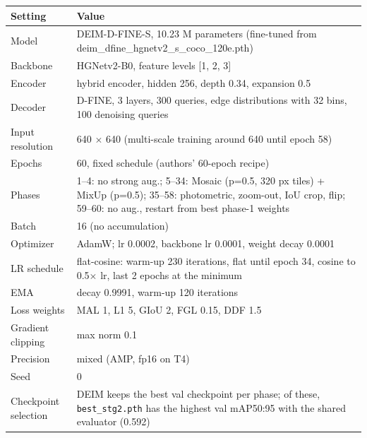 \begin{tabular}{p{3.6cm}p{10.4cm}}
\toprule
Setting & Value \\
\midrule
Model & DEIM-D-FINE-S, 10.23 M parameters (fine-tuned from deim\_dfine\_hgnetv2\_s\_coco\_120e.pth) \\
Backbone & HGNetv2-B0, feature levels [1, 2, 3] \\
Encoder & hybrid encoder, hidden 256, depth 0.34, expansion 0.5 \\
Decoder & D-FINE, 3 layers, 300 queries, edge distributions with 32 bins, 100 denoising queries \\
Input resolution & 640 $\times$ 640 (multi-scale training around 640 until epoch 58) \\
Epochs & 60, fixed schedule (authors' 60-epoch recipe) \\
Phases & 1--4: no strong aug.; 5--34: Mosaic (p=0.5, 320 px tiles) + MixUp (p=0.5); 35--58: photometric, zoom-out, IoU crop, flip; 59--60: no aug., restart from best phase-1 weights \\
Batch & 16 (no accumulation) \\
Optimizer & AdamW; lr 0.0002, backbone lr 0.0001, weight decay 0.0001 \\
LR schedule & flat-cosine: warm-up 230 iterations, flat until epoch 34, cosine to 0.5$\times$ lr, last 2 epochs at the minimum \\
EMA & decay 0.9991, warm-up 120 iterations \\
Loss weights & MAL 1, L1 5, GIoU 2, FGL 0.15, DDF 1.5 \\
Gradient clipping & max norm 0.1 \\
Precision & mixed (AMP, fp16 on T4) \\
Seed & 0 \\
Checkpoint selection & DEIM keeps the best val checkpoint per phase; of these, \texttt{best\_stg2.pth} has the highest val mAP50:95 with the shared evaluator (0.592) \\
\bottomrule
\end{tabular}
